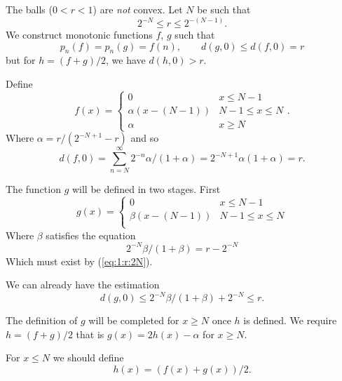 \begin{enumerate}
The balls (\(0<r<1\)) are \emph{not} convex.
Let $N$ be such that 
\begin{equation} \label{eq:1:r:2N}
2^{-N} \leq r \leq 2^{-(N-1)}.
\end{equation}
We construct monotonic functions $f$, $g$ such that
\begin{equation*}
p_n(f) = p_n(g) = f(n), \qquad d(g,0) \leq d(f,0) = r
\end{equation*}
but for \(h=(f+g)/2\), we have \(d(h,0)> r\).

Define
\begin{equation*}
f(x) = \left\{\begin{array}{lc}
              0               & x \leq N - 1 \\
              \alpha(x-(N-1)) & N -1 \leq x \leq N  \\
              \alpha          & x \geq N 
              \end{array}\right..
\end{equation*}
Where \(\alpha = r/(2^{-N+1} - r)\) 
and so 
\begin{equation*}
d(f,0) = \sum_{n=N}^\infty 2^{-n}\alpha/(1+\alpha) = 2^{-N+1}\alpha(1+\alpha)
       = r.
\end{equation*}

The function $g$ will be defined in two stages. First
\begin{equation*}
g(x) = \left\{\begin{array}{lc}
              0               & x \leq N - 1 \\
              \beta(x-(N-1)) & N -1 \leq x \leq N  \\
              \end{array}\right.
\end{equation*}
Where \(\beta\) satisfies the equation
\begin{equation*}
 2^{-N}\beta/(1+\beta) = r - 2^{-N}
\end{equation*}
Which must exist by (\ref{eq:1:r:2N}).

We can already have the estimation
\begin{equation*}
d(g,0) \leq 2^{-N}\beta/(1+\beta) + 2^{-N} \leq r.
\end{equation*}

The definition of $g$ will be completed  for \(x\geq N\) once  $h$
is defined. 
We require \(h=(f+g)/2\) that is \(g(x)=2h(x)-\alpha\) for \(x\geq N\).

For \(x\leq N\) we should define 
\begin{equation*}
h(x) = (f(x)+g(x))/2.
\end{equation*}


\end{enumerate}
